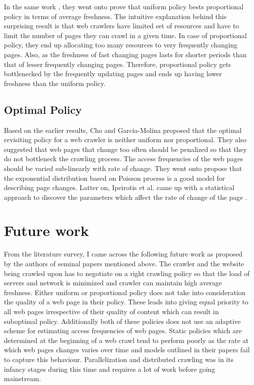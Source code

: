 \documentclass[a4paper, 11pt]{article} %
\begin{document}
In the same work \cite{cho2003estimating}, they went onto prove that uniform policy bests proportional policy in terms of average freshness. The intuitive explanation behind this surprising result is that web crawlers have limited set of resources and have to limit the number of pages they can crawl in a given time. In case of proportional policy, they end up allocating too many resources to very frequently changing pages. Also, as the freshness of fast changing pages lasts for shorter periods than that of lesser frequently changing pages. Therefore, proportional policy gets bottlenecked by the frequently updating pages and ends up having lower freshness than the uniform policy.

\subsection{Optimal Policy}

Based on the earlier results, Cho and Garcia-Molina proposed that the optimal revisiting policy for a web crawler is neither uniform nor proportional. \cite{cho2003estimating} They also suggested that web pages that change too often should be penalized so that they do not bottleneck the crawling process. The access frequencies of the web pages should be varied sub-linearly with rate of change. They went onto propose that the exponential distribution based on Poisson process is a good model for describing page changes. Latter on, Ipeirotis et al. came up with a statistical approach to discover the parameters which affect the rate of change of the page \cite{ipeirotis2005modeling}.

\section{Future work}

From the literature survey, I came across the following future work as proposed by the authors of seminal papers mentioned above. The crawler and the website being crawled upon has to negotiate on a right crawling policy so that the load of servers and network is minimized and crawler can maintain high average freshness. Either uniform or proportional policy does not take into consideration the quality of a web page in their policy. These leads into giving equal priority to all web pages irrespective of their quality of content which can result in suboptimal policy. Additionally both of these policies does not use an adaptive scheme for estimating access frequencies of web pages. Static policies which are determined at the beginning of a web crawl tend to perform poorly as the rate at which web pages changes varies over time and models outlined in their papers fail to capture this behaviour. Parallelization and distributed crawling  was in its infancy stages during this time and requires a lot of work before going mainstream.
\end{document}
